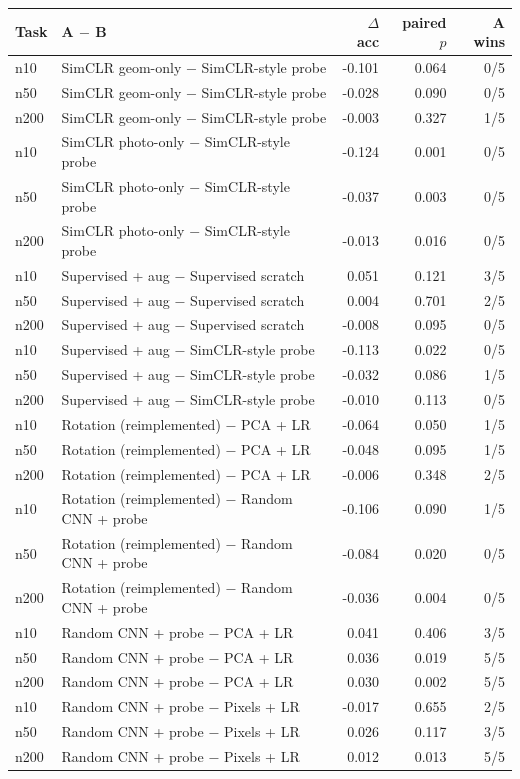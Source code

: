 \begin{tabular}{llrrr}
\toprule
Task & A $-$ B & $\Delta$ acc & paired $p$ & A wins \\
\midrule
n10 & SimCLR geom-only $-$ SimCLR-style probe & -0.101 & 0.064 & 0/5 \\
n50 & SimCLR geom-only $-$ SimCLR-style probe & -0.028 & 0.090 & 0/5 \\
n200 & SimCLR geom-only $-$ SimCLR-style probe & -0.003 & 0.327 & 1/5 \\
\midrule
n10 & SimCLR photo-only $-$ SimCLR-style probe & -0.124 & 0.001 & 0/5 \\
n50 & SimCLR photo-only $-$ SimCLR-style probe & -0.037 & 0.003 & 0/5 \\
n200 & SimCLR photo-only $-$ SimCLR-style probe & -0.013 & 0.016 & 0/5 \\
\midrule
n10 & Supervised + aug $-$ Supervised scratch & 0.051 & 0.121 & 3/5 \\
n50 & Supervised + aug $-$ Supervised scratch & 0.004 & 0.701 & 2/5 \\
n200 & Supervised + aug $-$ Supervised scratch & -0.008 & 0.095 & 0/5 \\
\midrule
n10 & Supervised + aug $-$ SimCLR-style probe & -0.113 & 0.022 & 0/5 \\
n50 & Supervised + aug $-$ SimCLR-style probe & -0.032 & 0.086 & 1/5 \\
n200 & Supervised + aug $-$ SimCLR-style probe & -0.010 & 0.113 & 0/5 \\
\midrule
n10 & Rotation (reimplemented) $-$ PCA + LR & -0.064 & 0.050 & 1/5 \\
n50 & Rotation (reimplemented) $-$ PCA + LR & -0.048 & 0.095 & 1/5 \\
n200 & Rotation (reimplemented) $-$ PCA + LR & -0.006 & 0.348 & 2/5 \\
\midrule
n10 & Rotation (reimplemented) $-$ Random CNN + probe & -0.106 & 0.090 & 1/5 \\
n50 & Rotation (reimplemented) $-$ Random CNN + probe & -0.084 & 0.020 & 0/5 \\
n200 & Rotation (reimplemented) $-$ Random CNN + probe & -0.036 & 0.004 & 0/5 \\
\midrule
n10 & Random CNN + probe $-$ PCA + LR & 0.041 & 0.406 & 3/5 \\
n50 & Random CNN + probe $-$ PCA + LR & 0.036 & 0.019 & 5/5 \\
n200 & Random CNN + probe $-$ PCA + LR & 0.030 & 0.002 & 5/5 \\
\midrule
n10 & Random CNN + probe $-$ Pixels + LR & -0.017 & 0.655 & 2/5 \\
n50 & Random CNN + probe $-$ Pixels + LR & 0.026 & 0.117 & 3/5 \\
n200 & Random CNN + probe $-$ Pixels + LR & 0.012 & 0.013 & 5/5 \\
\bottomrule
\end{tabular}
